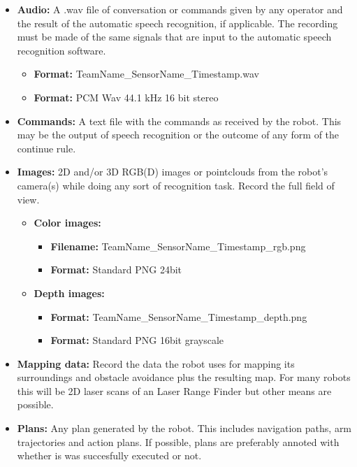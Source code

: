     \begin{itemize}
    
    \item \textbf{Audio: } A .wav file of conversation or commands given by any operator and the result of the automatic speech recognition, if applicable.
      The recording must be made of the same signals that are input to the automatic speech recognition software. 
      \begin{itemize}
	\item \textbf{Format: } TeamName\_SensorName\_Timestamp.wav
	\item \textbf{Format: } PCM Wav 44.1 kHz 16 bit stereo
      \end{itemize}
      
    \item \textbf{Commands: } A text file with the commands as received by the robot. 
      This may be the output of speech recognition or the outcome of any form of the continue rule.
    
    \item \textbf{Images: } 2D and/or 3D RGB(D) images or pointclouds from the robot's camera(s) while doing any sort of recognition task.
			    Record the full field of view. 
    \begin{itemize}
      \item
	\textbf{Color images: } 
	\begin{itemize}
	  \item \textbf{Filename: } TeamName\_SensorName\_Timestamp\_rgb.png
	  \item \textbf{Format: } Standard PNG 24bit
	\end{itemize}
      \item
	\textbf{Depth images: } 
	\begin{itemize}
	  \item \textbf{Format: } TeamName\_SensorName\_Timestamp\_depth.png
	  \item \textbf{Format: } Standard PNG 16bit grayscale
	\end{itemize}
    \end{itemize}
    
    \item \textbf{Mapping data: } Record the data the robot uses for mapping its surroundings and obstacle avoidance plus the resulting map. 
      For many robots this will be 2D laser scans of an Laser Range Finder but other means are possible. 
    
    \item \textbf{Plans: } Any plan generated by the robot. This includes navigation paths, arm trajectories and action plans. 
      If possible, plans are preferably annoted with whether is was succesfully executed or not.
    \end{itemize}
    
